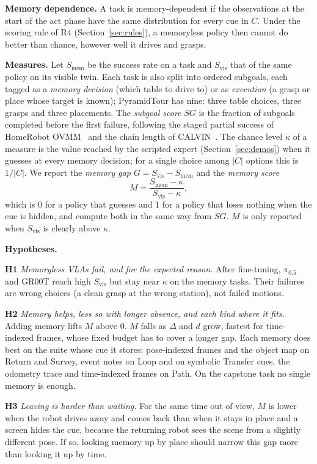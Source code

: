 \documentclass[conference]{IEEEtran}
\newcommand{\Smem}{S_{\mathrm{mem}}}
\newcommand{\Svis}{S_{\mathrm{vis}}}
\newcommand{\SG}{\mathit{SG}}
\newcommand{\pizf}{$\pi_{0.5}$}
\begin{document}
\textbf{Memory dependence.} A task is memory-dependent if the observations at the start of the act phase have the same distribution for every cue in $C$. Under the scoring rule of R4 (Section~\ref{sec:rules}), a memoryless policy then cannot do better than chance, however well it drives and grasps.

\textbf{Measures.} Let $\Smem$ be the success rate on a task and $\Svis$ that of the same policy on its visible twin. Each task is also split into ordered subgoals, each tagged as a \emph{memory decision} (which table to drive to) or as \emph{execution} (a grasp or place whose target is known); PyramidTour has nine: three table choices, three grasps and three placements. The \emph{subgoal score} $\SG$ is the fraction of subgoals completed before the first failure, following the staged partial success of HomeRobot OVMM~\cite{yenamandra2023homerobot} and the chain length of CALVIN~\cite{mees2022calvin}. The chance level $\kappa$ of a measure is the value reached by the scripted expert (Section~\ref{sec:demos}) when it guesses at every memory decision; for a single choice among $|C|$ options this is $1/|C|$. We report the \emph{memory gap} $G = \Svis - \Smem$ and the \emph{memory score}
\begin{equation}
M = \frac{\Smem - \kappa}{\Svis - \kappa},
\label{eq:memscore}
\end{equation}
which is 0 for a policy that guesses and 1 for a policy that loses nothing when the cue is hidden, and compute both in the same way from $\SG$. $M$ is only reported when $\Svis$ is clearly above $\kappa$.

\textbf{Hypotheses.}

\textbf{H1} \emph{Memoryless VLAs fail, and for the expected reason.} After fine-tuning, \pizf{} and GR00T reach high $\Svis$ but stay near $\kappa$ on the memory tasks. Their failures are wrong choices (a clean grasp at the wrong station), not failed motions.

\textbf{H2} \emph{Memory helps, less so with longer absence, and each kind where it fits.} Adding memory lifts $M$ above 0. $M$ falls as $\Delta$ and $d$ grow, fastest for time-indexed frames, whose fixed budget has to cover a longer gap. Each memory does best on the suite whose cue it stores: pose-indexed frames and the object map on Return and Survey, event notes on Loop and on symbolic Transfer cues, the odometry trace and time-indexed frames on Path. On the capstone task no single memory is enough.

\textbf{H3} \emph{Leaving is harder than waiting.} For the same time out of view, $M$ is lower when the robot drives away and comes back than when it stays in place and a screen hides the cue, because the returning robot sees the scene from a slightly different pose. If so, looking memory up by place should narrow this gap more than looking it up by time.
\end{document}
